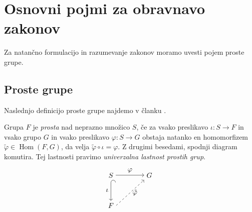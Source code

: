 \section{Osnovni pojmi za obravnavo zakonov}

Za natančno formulacijo in razumevanje zakonov moramo uvesti pojem proste grupe.

\subsection{Proste grupe}

Naslednjo definicijo proste grupe najdemo v članku \cite{Pogacnik_2024}.

\begin{definicija}
\label{def_prosta_grupa}
Grupa $F$ je \emph{prosta} nad neprazno množico $S$, če za vsako preslikavo $\iota : S \to F$ in vsako grupo $G$ in vsako preslikavo $\varphi: S \to  G$ obstaja natanko en homomorfizem $\tilde{\varphi} \in \operatorname{Hom}(F, G)$,
da velja $\tilde{\varphi} \circ \iota = \varphi$. Z drugimi besedami, spodnji diagram komutira. Tej lastnosti pravimo \emph{univerzalna lastnost prostih grup}.  
\[ 
\begin{tikzpicture}
    \matrix (m)
      [
        matrix of math nodes,
        row sep    = 3em,
        column sep = 4em
      ]
      {
        S    & G \\
        F  &             \\
      };
    \path
      (m-1-1) edge [{Hooks[right,length=0.8ex]}->] node [left] {$\iota$} (m-2-1)
      (m-1-1.east |- m-1-2)
        edge [->] node [above] {$\varphi$} (m-1-2)
      (m-2-1.east) edge [->,
        dashed] node [right] {$\tilde{\varphi}$} (m-1-2);
  \end{tikzpicture} \]
\end{definicija}

